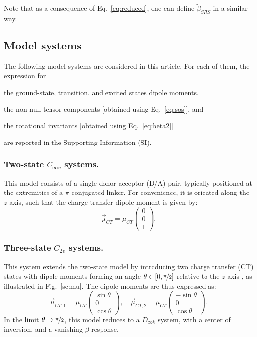 \documentclass[USenglish]{article}
\begin{document}
Note that as a consequence of Eq.~\eqref{eq:reduced}, one can define $\tilde\beta_{SHS}$ in a similar way.

\subsection{Model systems}

The following model systems are considered in this article. For each of them, the expression for \begin{inparaenum}[i)]
	\item the ground-state, transition, and excited states dipole moments,
	\item the non-null tensor components [obtained using Eq.~\ref{eq:sos}], and
	\item the rotational invariants [obtained using Eq.~\eqref{eq:beta2}]
\end{inparaenum} are reported in the Supporting Information (SI).

\subsubsection{Two-state $C_{\infty v}$ systems.}  
This model consists of a single donor-acceptor (D/A) pair, typically positioned at the extremities of a $\pi$-conjugated linker. For convenience, it is oriented along the $z$-axis, such that the charge transfer dipole moment is given by:  
\begin{equation*}
	\vec{\mu}_{CT} = \mu_{CT} \begin{pmatrix} 0 \\ 0 \\ 1 \end{pmatrix}.
\end{equation*}

\subsubsection{Three-state $C_{2v}$ systems.}  
This system extends the two-state model by introducing two charge transfer (CT) states with dipole moments forming an angle $\theta \in [0, \nicefrac{\pi}{2}]$ relative to the $z$-axis \cite{yangLargeOffDiagonalContribution2003}, as illustrated in Fig.~\ref{sc:mu}. The dipole moments are thus expressed as:  
\begin{equation*}
	\vec{\mu}_{CT,1} = \mu_{CT} \begin{pmatrix} \sin\theta \\ 0 \\ \cos\theta \end{pmatrix}, \quad  
	\vec{\mu}_{CT,2} = \mu_{CT} \begin{pmatrix} -\sin\theta \\ 0 \\ \cos\theta \end{pmatrix}.
\end{equation*}
In the limit $\theta \to \nicefrac{\pi}{ 2}$, this model reduces to a $D_{\infty h}$ system, with a center of inversion, and a vanishing $\beta$ response. 
\end{document}
